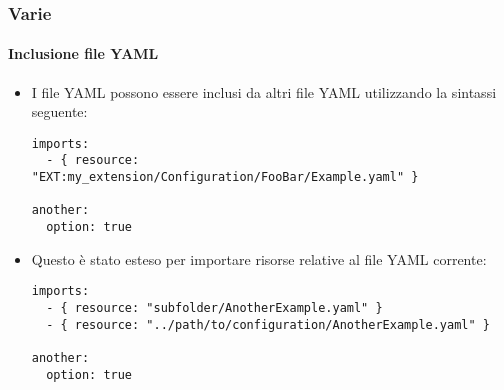 
\begin{frame}[fragile]
	\frametitle{Varie}
	\framesubtitle{Inclusione file YAML}

	\lstset{basicstyle=\tiny\ttfamily}

	\begin{itemize}
		\item I file YAML possono essere inclusi da altri file YAML utilizzando la sintassi seguente:

\begin{lstlisting}
imports:
  - { resource: "EXT:my_extension/Configuration/FooBar/Example.yaml" }

another:
  option: true
\end{lstlisting}

		\item Questo è stato esteso per importare risorse relative al file YAML corrente:

\begin{lstlisting}
imports:
  - { resource: "subfolder/AnotherExample.yaml" }
  - { resource: "../path/to/configuration/AnotherExample.yaml" }

another:
  option: true
\end{lstlisting}

	\end{itemize}

\end{frame}

